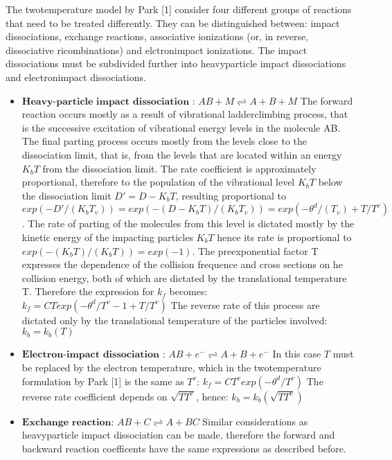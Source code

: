 \documentclass[letterpaper,10pt,english]{jupyterBook}
\begin{document}
\sphinxAtStartPar
The two\sphinxhyphen{}temperature model by Park {[}1{]} consider four different groups of reactions that need to be treated differently. They can be distinguished between: impact dissociations, exchange reactions, associative ionizations (or, in reverse, dissociative ricombinations) and elctron\sphinxhyphen{}impact ionizations. The impact dissociations must be subdivided further into heavy\sphinxhyphen{}particle impact dissociations and electron\sphinxhyphen{}impact dissociations. 
\begin{itemize}
\item {} 
\sphinxAtStartPar
\(\textbf{Heavy-particle impact dissociation}\) : 
\(
AB + M \rightleftharpoons A + B + M
\) 
The forward reaction occurs mostly as a result of vibrational ladder\sphinxhyphen{}climbing process, that is the successive excitation of vibrational energy levels in the molecule AB. The final parting process occurs mostly from the levels close to the dissociation limit, that is, from the levels that are located within an energy \(K_bT\) from the dissociation limit. The rate coefficient is approximately proportional, therefore to the population of the vibrational level \(K_bT\) below the dissociation limit \(D' = D - K_bT\), resulting proportional to  \(exp(− D' /(K_b T_v)) = exp(− (D - K_bT) /(K_b T_v)) = exp(− \theta^d /(T_v) + T/T^v)\). The rate of parting of the molecules from this level is dictated mostly by the kinetic energy of the impacting particles \(K_bT\) hence its rate is proportional to \(exp(−(K_b T)/(K_b T)) = exp(−1)\). The preexponential factor T expresses the dependence of the collision frequence and cross sections on he collision energy, both of which are dictated by the translational temperature T. Therefore the expression for \(k_f\) becomes:
\(k_f = C T exp(- \theta^d/T^v - 1 + T/T^v)\) 
The reverse rate of this process are dictated only by the translational temperature of the particles involved:
\(k_b = k_b(T)\)

\item {} 
\sphinxAtStartPar
\(\textbf{Electron-impact dissociation}\) : 
\(
AB + e^- \rightleftharpoons A + B + e^-
\) 
In this case \(T\) must be replaced by the electron temperature, which in the two\sphinxhyphen{}temperature formulation by Park {[}1{]} is the same as \(T^v\): 
\(k_f = C T^v exp(- \theta^d/T^v)\) 
The reverse rate coefficient depends on \(\sqrt{T T^v}\), hence: 
\(k_b = k_b(\sqrt{T T^v})\)

\item {} 
\sphinxAtStartPar
\(\textbf{Exchange reaction}\):
\(
AB + C \rightleftharpoons A + BC
\) 
Similar considerations as heavy\sphinxhyphen{}particle impact dissociation can be made, therefore the forward and backward reaction coefficents have the same expressions as described before.


\end{itemize}
\end{document}
